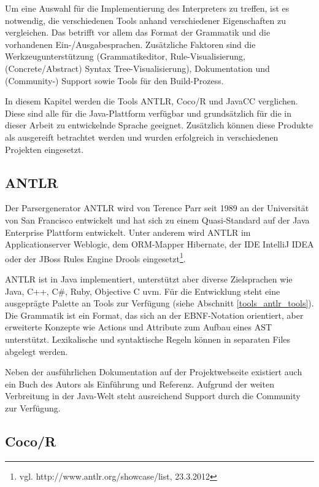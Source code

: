 Um eine Auswahl für die Implementierung des Interpreters zu treffen, ist es not\-wen\-dig, die verschiedenen Tools anhand verschiedener Eigenschaften zu vergleichen. Das betrifft vor allem das Format der Grammatik und die vorhandenen Ein-/Ausgabesprachen.
Zu\-sätz\-liche Faktoren sind die Werkzeugunterstützung (Grammatikeditor, Rule-Visualisierung, (Concrete/Abstract) Syntax Tree-Visualisierung), Dokumentation und (Community-) Support sowie Tools für den Build-Prozess.

In diesem Kapitel werden die Tools ANTLR, Coco/R und JavaCC verglichen. Diese sind alle für die Java-Plattform verfügbar und grund\-sätz\-lich für die in dieser Arbeit zu entwickelnde Sprache geeignet. Zu\-sätz\-lich können diese Produkte als ausgereift betrachtet werden und wurden erfolgreich in verschiedenen Projekten eingesetzt.


\subsection{ANTLR}

Der Parsergenerator ANTLR wird von Terence Parr seit 1989 an der Universität von San Francisco entwickelt und hat sich zu einem Quasi-Standard auf der Java Enterprise Plattform entwickelt. Unter anderem wird ANTLR im Applicationserver Weblogic, dem ORM-Mapper Hibernate, der IDE IntelliJ IDEA oder der JBoss Rules Engine Drools eingesetzt\footnote{vgl. http://www.antlr.org/showcase/list, 23.3.2012}.

ANTLR ist in Java implementiert, unterstützt aber diverse Zielsprachen wie Java, C++, C\#, Ruby, Objective C uvm. Für die Entwicklung steht eine ausgeprägte Palette an Tools zur Verfügung (siehe Abschnitt \ref{tools_antlr_tools}). Die Grammatik ist ein Format, das sich an der EBNF-Notation orientiert, aber erweiterte Konzepte wie Actions und Attribute zum Aufbau eines AST unterstützt. Lexikalische und syntaktische Regeln können in separaten Files abgelegt werden.

Neben der ausführlichen Dokumentation auf der Projektwebseite existiert auch ein Buch des Autors als Einführung und Referenz\cite{Parr07}. Aufgrund der weiten Verbreitung in der Java-Welt steht ausreichend Support durch die Community zur Verfügung.



\subsection{Coco/R} 


